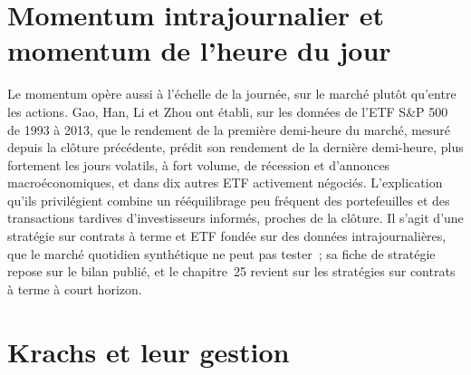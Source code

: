 \begin{omfigure}

\label{fig:s1:momentum:books}
\end{omfigure}

\section{Momentum intrajournalier et momentum de l'heure du jour}

Le momentum opère aussi à l'échelle de la journée, sur le marché plutôt qu'entre les actions. Gao, Han, Li et Zhou ont établi, sur les données de l'ETF S\&P 500 de 1993 à 2013, que
le rendement de la première demi-heure du marché, mesuré depuis la clôture précédente, prédit son rendement de la dernière demi-heure, plus fortement les jours volatils, à fort volume, de récession et
d'annonces macroéconomiques, et dans dix autres ETF activement négociés. L'explication qu'ils privilégient combine un rééquilibrage peu fréquent des portefeuilles et des transactions tardives
d'investisseurs informés, proches de la clôture. Il s'agit d'une stratégie sur contrats à terme et ETF fondée sur des données intrajournalières, que le marché quotidien synthétique ne peut pas tester~; sa
fiche de stratégie repose sur le bilan publié, et le chapitre~25 revient sur les stratégies sur contrats à terme à court horizon.

\section{Krachs et leur gestion}


